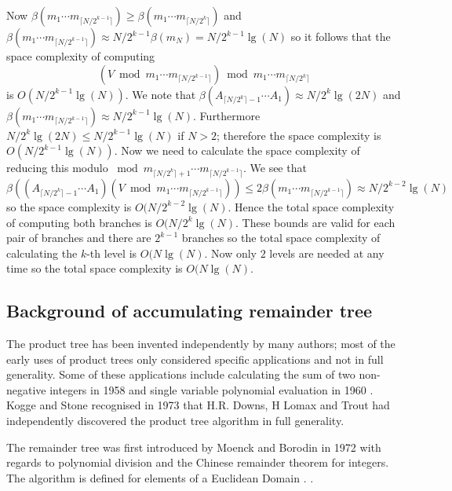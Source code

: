 Now $\beta( m_{1}\cdots m_{\lceil N/2^{k-1}\rceil}) \geq \beta( m_{1}\cdots m_{\lceil N/2^{k}\rceil})    $ and $\beta( m_{1}\cdots m_{\lceil N/2^{k-1}\rceil}) \approx  N/2^{k-1} \beta(m_N)=N/2^{k-1} \lg(N)$ so it follows that the space complexity of computing \[ \left( V\bmod m_{1}\cdots m_{\lceil N/2^{k-1}\rceil}\right)\bmod m_{1}\cdots m_{\lceil N/2^{k}\rceil}\] is $O(N/2^{k-1}\lg(N))$. We note that $\beta(A_{\lceil N/2^k\rceil-1}\cdots A_{1})\approx N/2^{k}\lg(2N)$ and $\beta( m_{1}\cdots m_{\lceil N/2^{k-1}\rceil}) \approx N/2^{k-1}\lg(N)$. Furthermore $N/2^{k}\lg(2N) \leq N/2^{k-1}\lg(N)$ if $N>2$; therefore the space complexity is $O(N/2^{k-1}\lg(N))$. Now we need to calculate the space complexity of reducing this modulo $\bmod m_{\lceil N/2^{k}\rceil +1}\cdots m_{\lceil N/2^{k-1}\rceil}$. We see that \[ \beta(\left( A_{\lceil N/2^k\rceil-1}\cdots A_{1}\right) \left( V\bmod m_{1}\cdots m_{\lceil N/2^{k-1}\rceil}\right)) \leq 2\beta(m_1\cdots m_{\lceil N/2^{k-1}\rceil}) \approx N/2^{k-2}\lg(N)\] so the space complexity is $O(N/2^{k-2}\lg(N)$. Hence the total space complexity of computing both branches is $O(N/2^{k}\lg(N)$. These bounds are valid for each pair of branches and there are $2^{k-1}$ branches so the total space complexity of calculating the $k$-th level is $O(N\lg(N)$. Now only $2$ levels are needed at any time so the total space complexity is $O(N\lg(N)$.  


\subsection{Background of accumulating remainder tree}


The product tree has been invented independently by many authors; most of the early uses of product trees only considered specific applications and not in full generality. Some of these applications include 
calculating the sum of two non-negative integers in 1958  and single variable polynomial evaluation in 1960 . Kogge and Stone recognised in 1973 that H.R. Downs, H Lomax and Trout had independently discovered the product tree algorithm in full generality. 

The remainder tree was first introduced by Moenck and Borodin in 1972 with regards to polynomial division and the Chinese remainder theorem for integers. The algorithm is defined for elements of a Euclidean Domain \cite{MB72}.    .       

